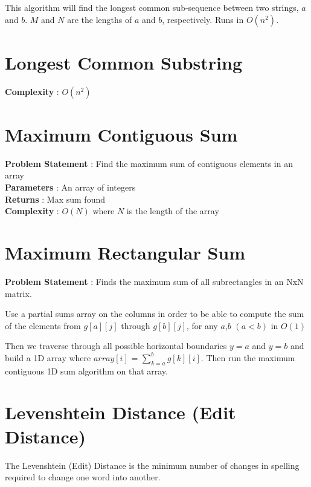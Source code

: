 	This algorithm will find the longest common sub-sequence between two 
	strings, $a$ and $b$. $M$ and $N$ are the lengths of $a$ and $b$, 
	respectively. Runs in $O(n^2)$.
	
	
	
	\section{Longest Common Substring}
	
	{\bf Complexity} : $O(n^2)$
	
	

	\section{Maximum Contiguous Sum}
	
	{\bf Problem Statement} : Find the maximum sum of contiguous elements in an array\\
    {\bf Parameters} : An array of integers\\
    {\bf Returns} : Max sum found\\
    {\bf Complexity} : $O(N)$ where $N$ is the length of the array\\
    
    

	
	\section{Maximum Rectangular Sum}
	
	{\bf Problem Statement} : Finds the maximum sum of all subrectangles in an NxN matrix.
 
    Use a partial sums array on the columns in order to be able to compute the 
    sum of the elements from $g[a][j]$ through $g[b][j]$, for any $a$,$b$ $(a<b)$ 
    in $O(1)$
 
    Then we traverse through all possible horizontal boundaries $y=a$ and $y=b$ and 
    build a 1D array where $array[i]$ = $\sum_{k=a}^{b}g[k][i]$. Then run the 
    maximum contiguous 1D sum algorithm on that array.
	
	\section{Levenshtein Distance (Edit Distance)}
	
	The Levenshtein (Edit) Distance is the minimum number of changes in spelling 
	required to change one word into another.
	
	